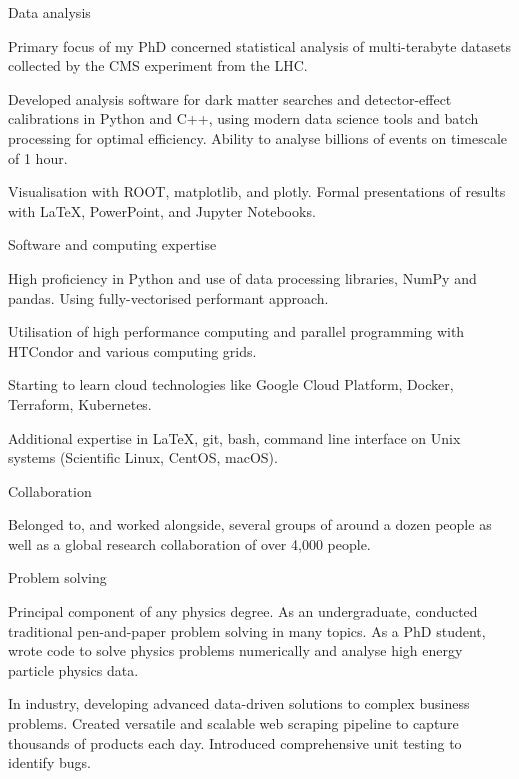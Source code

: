 
\begin{cventries}

    \cventry
    {} %
    {Data analysis} %
    {} %
    {} %
    {
      \begin{cvitems}
        \item {Primary focus of my PhD concerned statistical analysis of multi-terabyte datasets collected by the CMS experiment from the LHC.}
        \item {Developed analysis software for dark matter searches and detector-effect calibrations in Python and C++, using modern data science tools and batch processing for optimal efficiency. Ability to analyse billions of events on timescale of 1 hour.}
        \item {Visualisation with ROOT, matplotlib, and plotly. Formal presentations of results with LaTeX, PowerPoint, and Jupyter Notebooks.}
        \end{cvitems}
    }

    \cventry
    {} %
    {Software and computing expertise} %
    {} %
    {} %
    {
      \begin{cvitems}
        \item {High proficiency in Python and use of data processing libraries, NumPy and pandas. Using fully-vectorised performant approach.}
        \item {Utilisation of high performance computing and parallel programming with HTCondor and various computing grids.}
        \item {Starting to learn cloud technologies like Google Cloud Platform, Docker, Terraform, Kubernetes.}
        \item {Additional expertise in LaTeX, git, bash, command line interface on Unix systems (Scientific Linux, CentOS, macOS).}
        \end{cvitems}
    }

    \cventry
    {}
    {Collaboration}
    {}
    {}
    {
      \begin{cvitems}
        \item {Belonged to, and worked alongside, several groups of around a dozen people as well as a global research collaboration of over 4,000 people.}
        \end{cvitems}
    }

    \cventry
    {}
    {Problem solving}
    {}
    {}
    {
      \begin{cvitems}
        \item {Principal component of any physics degree. As an undergraduate, conducted traditional pen-and-paper problem solving in many topics. As a PhD student, wrote code to solve physics problems numerically and analyse high energy particle physics data.}
        \item {In industry, developing advanced data-driven solutions to complex business problems. Created versatile and scalable web scraping pipeline to capture thousands of products each day. Introduced comprehensive unit testing to identify bugs.}
        \end{cvitems}
    }


\end{cventries}
